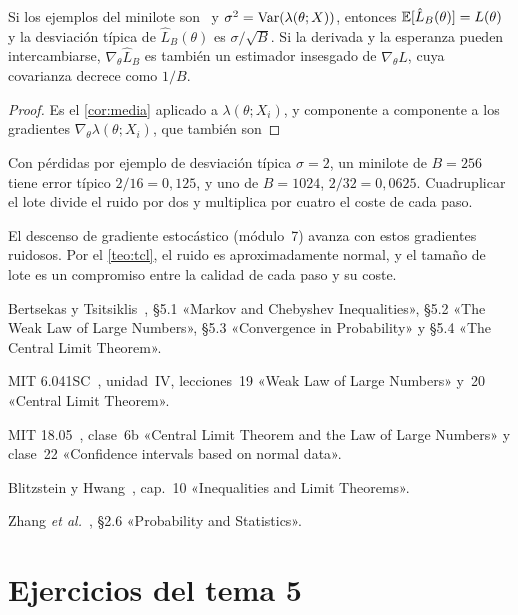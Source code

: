 \begin{proposicion}\label{prop:minilote}
Si los ejemplos del minilote son \iid\ y $\sigma^{2}=\operatorname{Var}(\lambda(\theta;X))$, entonces $\mathbb{E}[\hat L_B(\theta)]=L(\theta)$ y la desviación típica de $\hat L_B(\theta)$ es $\sigma/\sqrt B$. Si la derivada y la esperanza pueden intercambiarse, $\nabla_\theta\hat L_B$ es también un estimador insesgado de $\nabla_\theta L$, cuya covarianza decrece como $1/B$.
\end{proposicion}

\begin{proof}
Es el \cref{cor:media} aplicado a $\lambda(\theta;X_i)$, y componente a componente a los gradientes $\nabla_\theta\lambda(\theta;X_i)$, que también son \iid
\end{proof}

\begin{ejemplo}
Con pérdidas por ejemplo de desviación típica $\sigma=2$, un minilote de $B=256$ tiene error típico $2/16=0{,}125$, y uno de $B=1024$, $2/32=0{,}0625$. Cuadruplicar el lote divide el ruido por dos y multiplica por cuatro el coste de cada paso.
\end{ejemplo}

El descenso de gradiente estocástico (módulo~7) avanza con estos gradientes ruidosos. Por el \cref{teo:tcl}, el ruido es aproximadamente normal, y el tamaño de lote es un compromiso entre la calidad de cada paso y su coste.

\begin{lecturas}
\item Bertsekas y Tsitsiklis~\cite{bt}, §5.1 «Markov and Chebyshev Inequalities», §5.2 «The Weak Law of Large Numbers», §5.3 «Convergence in Probability» y §5.4 «The Central Limit Theorem».
\item MIT 6.041SC~\cite{mit6041}, unidad~IV, lecciones~19 «Weak Law of Large Numbers» y~20 «Central Limit Theorem».
\item MIT 18.05~\cite{mit1805}, clase~6b «Central Limit Theorem and the Law of Large Numbers» y clase~22 «Confidence intervals based on normal data».
\item Blitzstein y Hwang~\cite{bh}, cap.~10 «Inequalities and Limit Theorems».
\item Zhang \emph{et al.}~\cite{d2l}, §2.6 «Probability and Statistics».
\end{lecturas}

\section*{Ejercicios del tema 5}

